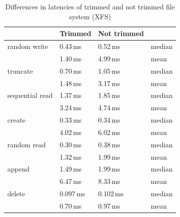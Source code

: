 \documentclass[
  color, %
  table, %
  lof,   %
  lot,   %
]{fithesis3}
\begin{document}
\begin{table}
\centering
\begin{tabular}{|l|l|l|l|}
\hline
 &Trimmed & Not trimmed &  \\
\hline
    random write & 0.43\,ms & 0.52\,ms & median \\
 \hline
                 & 1.40\,ms & 4.99\,ms & mean\\
    \hline
        truncate & 0.70\,ms & 1.05\,ms & median\\
    \hline
                 & 1.48\,ms & 3.17\,ms & mean \\
    \hline
           sequential read & 1.37\,ms & 1.85\,ms & median\\
    \hline
                 & 3.24\,ms & 4.74\,ms & mean \\
    \hline
          create & 0.33\,ms & 0.34\,ms & median\\
    \hline
                 & 4.02\,ms & 6.02\,ms & mean \\
    \hline
     random read & 0.30\,ms & 0.38\,ms & median\\
    \hline
                 & 1.32\,ms & 1.99\,ms & mean \\
    \hline
          append & 1.49\,ms & 1.99\,ms & median\\
    \hline
                 & 6.47\,ms & 8.33\,ms & mean \\
    \hline
          delete & 0.097\,ms & 0.102\,ms & median\\
    \hline
                & 0.70\,ms & 0.97\,ms & mean \\
    \hline
\end{tabular}
\caption{Differences in latencies of trimmed and not trimmed file system (XFS)}
\label{tab:trim}
\end{table}





\end{document}
